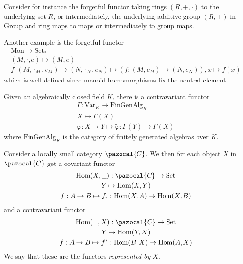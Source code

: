 \begin{example}
    Consider for instance the forgetful functor taking rings $(R,+,\cdot)$ to the underlying set $R$, or intermediately, the underlying additive group $(R,+)$ in $\mathrm{Group}$ and ring maps to maps or intermediately to group maps.  
\end{example}
\begin{example}
    Another example is the forgetful functor 
    \begin{gather*}
        \mathrm{Mon} \rightarrow \mathrm{Set}_\ast\\
        (M,\cdot,e)\mapsto (M,e)\\
        f : (M,\cdot_M,e_M)\rightarrow (N,\cdot_N,e_N) \mapsto (f: (M,e_M)\rightarrow (N,e_N)), x\mapsto f(x)
    \end{gather*}
    which is well-defined since monoid homomorphisms fix the neutral element.
\end{example}
\begin{example}
    Given an algebraically closed field $K$, there is a contravariant functor
    \begin{gather*}
        \Gamma : \mathrm{Var}_K\rightarrow \mathrm{FinGenAlg}_K\\
        X \mapsto \Gamma(X)\\
        \varphi : X\rightarrow Y \mapsto \widetilde{\varphi} : \Gamma(Y)\rightarrow \Gamma(X)
    \end{gather*}
    where $\mathrm{FinGenAlg}_K$ is the category of finitely generated algebras over $K$.
\end{example}
\begin{definition}
    Consider a locally small category $\pazocal{C}$. We then for each object $X$ in $\pazocal{C}$ get a covariant functor 
    \begin{gather*}
        \Hom(X,\_) : \pazocal{C}\rightarrow \mathrm{Set}\\
        Y\mapsto \Hom(X,Y)\\
        f : A\rightarrow B \mapsto f_\ast: \Hom(X,A)\rightarrow \Hom(X,B) 
    \end{gather*}
    and a contravariant functor
    \begin{gather*}
        \Hom(\_,X) : \pazocal{C} \rightarrow \mathrm{Set}\\
        Y \mapsto \Hom(Y,X)\\
        f : A\rightarrow B \mapsto f^\ast: \Hom(B,X)\rightarrow \Hom(A,X) 
    \end{gather*}
    We say that these are the functors \emph{represented by $X$}.
\end{definition}
